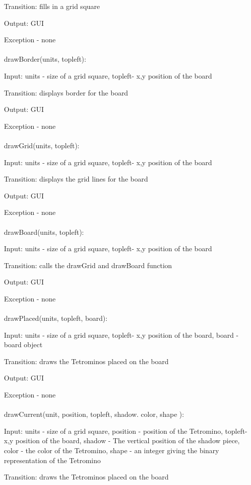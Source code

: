 \documentclass[12,english]{article}
\begin{document}
	  Transition: fills in a grid square
	  
	  Output: GUI
	  
	  Exception - none\\ 	  	  
	  \\
	  drawBorder(units, topleft):
		
	  Input: units - size of a grid square, topleft- x,y position of the board
		
	  Transition: displays border for the board
	  
	  Output: GUI
	  
	  Exception - none\\ 	  	  
	  \\
	drawGrid(units, topleft):
	
	  Input: units - size of a grid square, topleft- x,y position of the board
		
	  Transition: displays the grid lines for the board
	  
	  Output: GUI
	  
	  Exception - none\\ 
	  \\
	drawBoard(units, topleft):
	
	  Input: units - size of a grid square, topleft- x,y position of the board
		
	  Transition: calls the drawGrid and drawBoard function
	  
	  Output: GUI
	  
	  Exception - none\\ 	  
	  \\
	drawPlaced(units, topleft, board):
	
	  Input: units - size of a grid square, topleft- x,y position of the board, board - board object
		
	  Transition: draws the Tetrominos placed on the board
	  
	  Output: GUI
	  
	  Exception - none\\ 	  	  
\\
	drawCurrent(unit, position, topleft, shadow. color, shape ):
	
	  Input: units - size of a grid square, position - position of the Tetromino, topleft- x,y position of the board, 
	  shadow - The vertical position of the shadow piece, color - the color of the Tetromino, shape - an integer giving the binary representation of the Tetromino
		
	  Transition: draws the Tetrominos placed on the board
	  
\end{document}
